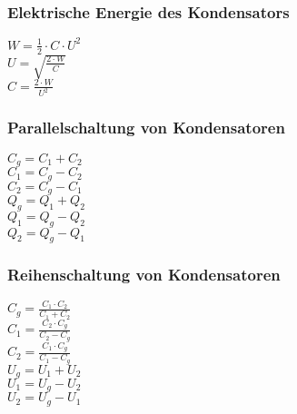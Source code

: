 \subsubsection{Elektrische Energie des Kondensators} 
\begin{minipage}{0.45\textwidth} 
$ W =\frac{1}{2}\cdot C\cdot U^{2} $\\ 
$ U = \sqrt{\frac{2\cdot W}{ C}} $\\ 
$ C = \frac{2\cdot W}{ U^{2} } $\\ 
\end{minipage} 
\begin{minipage}{0.45\textwidth} 
 
\end{minipage} 
\subsubsection{Parallelschaltung von Kondensatoren} 
\begin{minipage}{0.45\textwidth} 
$ C_{g}  = C_{1}  + C_{2} $\\ 
$ C_{1}  = C_{g}  - C_{2} $\\ 
$ C_{2}  = C_{g}  - C_{1} $\\ 
$ Q_{g}  = Q_{1}  + Q_{2} $\\ 
$ Q_{1}  = Q_{g}  - Q_{2} $\\ 
$ Q_{2}  = Q_{g}  - Q_{1} $\\ 
\end{minipage} 
\begin{minipage}{0.45\textwidth} 
 
\end{minipage} 
\subsubsection{Reihenschaltung von Kondensatoren} 
\begin{minipage}{0.45\textwidth} 
$ C_{g}  = \frac{C_{1} \cdot C_{2} }{C_{1} +C_{2} } $\\ 
$ C_{1}  = \frac{C_{2} \cdot C_{g} }{C_{2} -C_{g} } $\\ 
$ C_{2}  = \frac{C_{1} \cdot C_{g} }{C_{1} -C_{g} } $\\ 
$ U_{g}  = U_{1}  + U_{2} $\\ 
$ U_{1}  = U_{g}  - U_{2} $\\ 
$ U_{2}  = U_{g}  - U_{1} $\\ 
\end{minipage} 
\begin{minipage}{0.45\textwidth} 
 
\end{minipage} 
